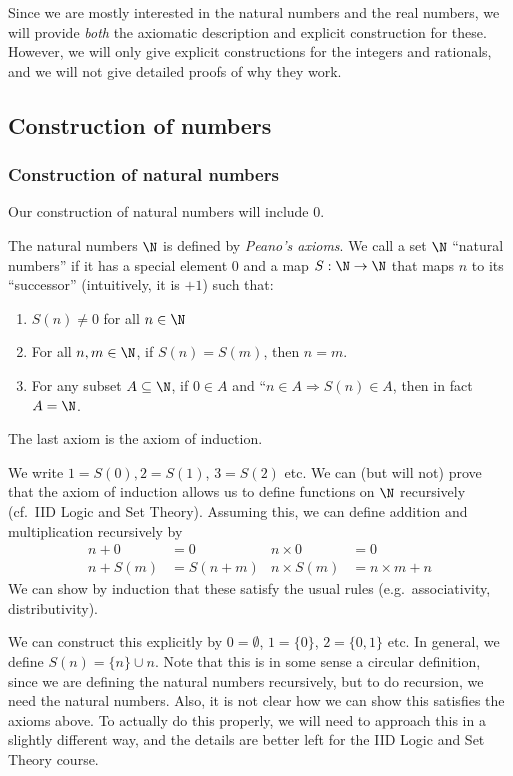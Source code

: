 \documentclass[a4paper]{article}
\begin{document}
Since we are mostly interested in the natural numbers and the real numbers, we will provide \emph{both} the axiomatic description and explicit construction for these. However, we will only give explicit constructions for the integers and rationals, and we will not give detailed proofs of why they work.

\subsection{Construction of numbers}
\subsubsection*{Construction of natural numbers}
Our construction of natural numbers will include $0$.

\begin{defi}
  The natural numbers $\N$ is defined by \emph{Peano's axioms}. We call a set $\N$ ``natural numbers'' if it has a special element $0$ and a map $S: \N \to \N$ that maps $n$ to its ``successor'' (intuitively, it is $+1$) such that:
  \begin{enumerate}
    \item $S(n) \not= 0$ for all $n \in \N$
    \item For all $n, m \in \N$, if $S(n) = S(m)$, then $n = m$.
    \item For any subset $A \subseteq \N$, if $0 \in A$ and ``$n \in A \Rightarrow S(n) \in A$, then in fact $A = \N$.
  \end{enumerate}
  The last axiom is the axiom of induction.

  We write $1 = S(0), 2 = S(1)$, $3 = S(2)$ etc. We can (but will not) prove that the axiom of induction allows us to define functions on $\N$ recursively (cf.\ IID Logic and Set Theory). Assuming this, we can define addition and multiplication recursively by
  \begin{align*}
    n + 0 &= 0 &n\times 0 &= 0\\
    n + S(m) &= S(n + m) & n \times S(m) &= n \times m + n
  \end{align*}
  We can show by induction that these satisfy the usual rules (e.g.\ associativity, distributivity).
\end{defi}
We can construct this explicitly by $0 = \emptyset$, $1 = \{0\}$, $2 = \{0, 1\}$ etc. In general, we define $S(n) = \{n\} \cup n$. Note that this is in some sense a circular definition, since we are defining the natural numbers recursively, but to do recursion, we need the natural numbers. Also, it is not clear how we can show this satisfies the axioms above. To actually do this properly, we will need to approach this in a slightly different way, and the details are better left for the IID Logic and Set Theory course.
\end{document}
